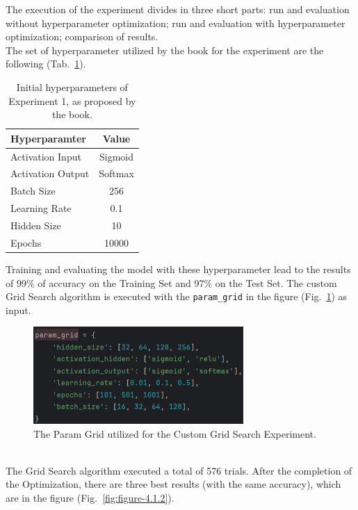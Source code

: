 The execution of the experiment divides in three short parts: run and evaluation without hyperparameter optimization; run and evaluation with hyperparameter optimization; comparison of results.
\\[0.3cm]The set of hyperparameter utilized by the book for the experiment are the following (Tab.~\ref{tab:table-4.1.1}).
\begin{table}[ht!]
	\center
	\setlength{\tabcolsep}{0.5cm}
	\caption[Initial Hyperparameters of Experiment 1]{Initial hyperparameters of Experiment 1, as proposed by the book.}
	\begin{tabular}{@{}lc@{}}
		\toprule
		\textbf{Hyperparamter} & \textbf{Value} \\ \midrule
		Activation Input       & Sigmoid               \\[0.1cm]
		Activation Output      & Softmax               \\[0.1cm]
		Batch Size             & 256                   \\[0.1cm]
		Learning Rate          & 0.1                   \\[0.1cm]
		Hidden Size            & 10                    \\[0.1cm]
		Epochs                 & 10000                 \\ \bottomrule
	\end{tabular}
	\label{tab:table-4.1.1}
\end{table}
Training and evaluating the model with these hyperparameter lead to the results of 99\% of accuracy on the Training Set and 97\% on the Test Set.
The custom Grid Search algorithm is executed with the \texttt{param\_grid} in the figure (Fig.~\ref{fig:figure-4.1.1}) as input.
\begin{figure}[t]
	\centering
	\includegraphics[width=8cm]{figures/figure-4.1.1.png}
	\caption[Param Grid for Custom Grid Search Experiment]{The Param Grid utilized for the Custom Grid Search Experiment.}
	\label{fig:figure-4.1.1}
\end{figure}
\\[0.3cm]The Grid Search algorithm executed a total of 576 trials. After the completion of the Optimization, there are three best results (with the same accuracy), which are in the figure (Fig.~\ref{fig:figure-4.1.2}).
